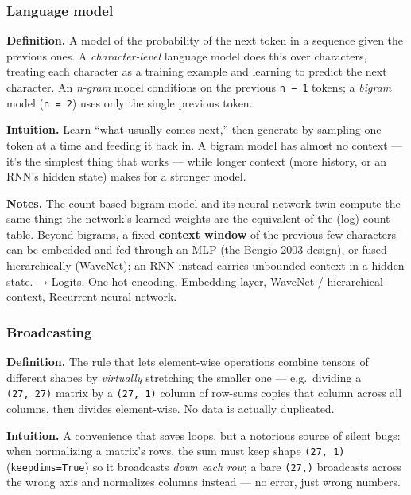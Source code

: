 \documentclass[
  10pt,
  letterpaper,
  onecolumn]{article}
\begin{document}
\hypertarget{language-model}{%
\subsubsection{Language model}\label{language-model}}

\textbf{Definition.} A model of the probability of the next token in a
sequence given the previous ones. A \emph{character-level} language
model does this over characters, treating each character as a training
example and learning to predict the next character. An \emph{n-gram}
model conditions on the previous \texttt{n\ −\ 1} tokens; a
\emph{bigram} model (\texttt{n\ =\ 2}) uses only the single previous
token.

\textbf{Intuition.} Learn ``what usually comes next,'' then generate by
sampling one token at a time and feeding it back in. A bigram model has
almost no context --- it's the simplest thing that works --- while
longer context (more history, or an RNN's hidden state) makes for a
stronger model.

\textbf{Notes.} The count-based bigram model and its neural-network twin
compute the same thing: the network's learned weights are the equivalent
of the (log) count table. Beyond bigrams, a fixed \textbf{context
window} of the previous few characters can be embedded and fed through
an MLP (the Bengio 2003 design), or fused hierarchically (WaveNet); an
RNN instead carries unbounded context in a hidden state. → Logits,
One-hot encoding, Embedding layer, WaveNet / hierarchical context,
Recurrent neural network.

\hypertarget{broadcasting}{%
\subsubsection{Broadcasting}\label{broadcasting}}

\textbf{Definition.} The rule that lets element-wise operations combine
tensors of different shapes by \emph{virtually} stretching the smaller
one --- e.g.~dividing a \texttt{(27,\ 27)} matrix by a \texttt{(27,\ 1)}
column of row-sums copies that column across all columns, then divides
element-wise. No data is actually duplicated.

\textbf{Intuition.} A convenience that saves loops, but a notorious
source of silent bugs: when normalizing a matrix's rows, the sum must
keep shape \texttt{(27,\ 1)} (\texttt{keepdims=True}) so it broadcasts
\emph{down each row}; a bare \texttt{(27,)} broadcasts across the wrong
axis and normalizes columns instead --- no error, just wrong numbers.
\end{document}
